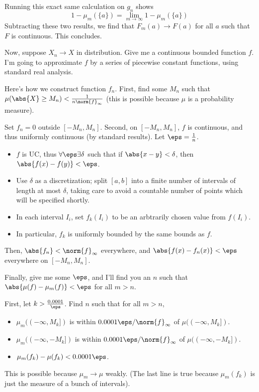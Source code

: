 \documentclass[11pt, headheight=30pt]{scrartcl}
\begin{document}
Running this exact same calculation on $g_n$ shows
\[
    1 - \mu_m(\{a\}) = \lim_{m\to \infty} 1 - \mu_m(\{a\})    
\]
Subtracting these two results, we find that $F_m(a)\to F(a)$
for all $a$ such that $F$ is continuous. This concludes.


Now, suppose $X_n \to X$ in distribution. Give me a continuous bounded
function $f$. I'm going to approximate $f$ by a series of piecewise
constant functions, using standard real analysis.

\begin{psec*}
    [Constructing $f_n$]
    Here's how we construct function $f_n$. First, find some $M_n$
    such that $\mu(\abs{X} \geq M_n) < \frac{1}{n\norm{f}_\infty}$ (this is possible because
    $\mu$ is a probability measure).

    Set $f_n = 0$ outside $[-M_n, M_n]$. Second, on $[-M_n, M_n]$,
    $f$ is continuous, and
    thus uniformly continuous (by standard results). Let $\eps = \frac{1}{n}$.
    \begin{itemize}
        \item $f$ is UC, thus $\forall\eps\exists \delta$
        such that if $\abs{x - y} < \delta$, then $\abs{f(x) - f(y)} < \eps$.
        \item Use $\delta$ as a discretization; split $[a,b]$
        into a finite number of intervals of length at most $\delta$, 
        taking care to avoid a countable number of points which will
        be specified shortly.
        \item In each interval $I_i$, set $f_k(I_i)$ to be an arbtrarily chosen
        value from $f(I_i)$.
        \item In particular, $f_k$ is uniformly bounded by
        the same bounds as $f$.
    \end{itemize}
    Then, $\abs{f_n} < \norm{f}_\infty$ everywhere, and $\abs{f(x) - f_n(x)} < \eps$
    everywhere on $[-M_n, M_n]$.
\end{psec*}


Finally, give me some $\eps$, and I'll find you an $n$ such that
$\abs{\mu(f) - \mu_m(f)} < \eps$ for all $m > n$.

First, let $k > \frac{0.0001}{\eps}$.
Find $n$ such that for all $m > n$,
\begin{itemize}
    \item $\mu_m((-\infty, M_k])$ is within $0.0001\eps/\norm{f}_\infty$ of $\mu((-\infty, M_k])$.
    \item $\mu_m((-\infty, -M_k])$ is within $0.0001\eps/\norm{f}_\infty$ of $\mu((-\infty, -M_k])$.
    \item $\mu_m(f_k) - \mu(f_k) < 0.0001\eps$.
\end{itemize}
This is possible because $\mu_m \to \mu$ weakly. (The last line is true
because $\mu_m(f_k)$ is just the measure of a bunch of intervals).
\end{document}
